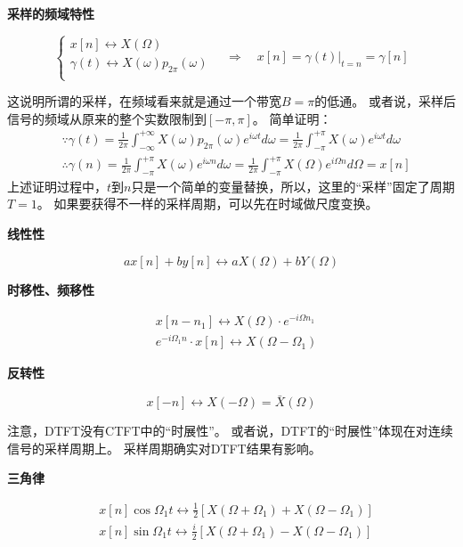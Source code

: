 {\bf 采样的频域特性}

\[
\begin{cases}
	x\left[ n \right] \leftrightarrow X\left( \varOmega \right)\\
	\gamma \left( t \right) \leftrightarrow X\left( \omega \right) p_{2\pi}\left( \omega \right)\\
\end{cases} \quad \Rightarrow \quad x\left[ n \right] =\left. \gamma \left( t \right) \right|_{t=n}=\gamma \left[ n \right]
\]

这说明所谓的采样，在频域看来就是通过一个带宽$B=\pi $的低通。
或者说，采样后信号的频域从原来的整个实数限制到$\left[ -\pi ,\pi \right] $。
简单证明：
\begin{align*}
&\because \gamma \left( t \right) =\frac{1}{2\pi}\int_{-\infty}^{+\infty}{X\left( \omega \right) p_{2\pi}\left( \omega \right) e^{i\omega t}d\omega}=\frac{1}{2\pi}\int_{-\pi}^{+\pi}{X\left( \omega \right) e^{i\omega t}d\omega} \\
&\therefore \gamma \left( n \right) =\frac{1}{2\pi}\int_{-\pi}^{+\pi}{X\left( \omega \right) e^{i\omega n}d\omega}=\frac{1}{2\pi}\int_{-\pi}^{+\pi}{X\left( \varOmega \right) e^{i\varOmega n}d\varOmega}=x\left[ n \right]
\end{align*}
上述证明过程中，$t$到$n$只是一个简单的变量替换，所以，这里的“采样”固定了周期$T=1$。
如果要获得不一样的采样周期，可以先在时域做尺度变换。

{\bf 线性性}

\[
ax\left[ n \right] +by\left[ n \right] \leftrightarrow aX\left( \varOmega \right) +bY\left( \varOmega \right)
\]

{\bf 时移性、频移性}

\begin{align*}
&x\left[ n-n_1 \right] \leftrightarrow X\left( \varOmega \right) \cdot e^{-i\varOmega n_1} \\
&e^{-i\varOmega _1n}\cdot x\left[ n \right] \leftrightarrow X\left( \varOmega -\varOmega _1 \right)
\end{align*}

{\bf 反转性}

\[
x\left[ -n \right] \leftrightarrow X\left( -\varOmega \right) =\bar{X}\left( \varOmega \right)
\]

注意，DTFT没有CTFT中的“时展性”。
或者说，DTFT的“时展性”体现在对连续信号的采样周期上。
采样周期确实对DTFT结果有影响。

{\bf 三角律}

\begin{align*}
&x\left[ n \right] \cos \varOmega _1t\leftrightarrow \frac{1}{2}\left[ X\left( \varOmega +\varOmega _1 \right) +X\left( \varOmega -\varOmega _1 \right) \right] \\
&x\left[ n \right] \sin \varOmega _1t\leftrightarrow \frac{i}{2}\left[ X\left( \varOmega +\varOmega _1 \right) -X\left( \varOmega -\varOmega _1 \right) \right]
\end{align*}

